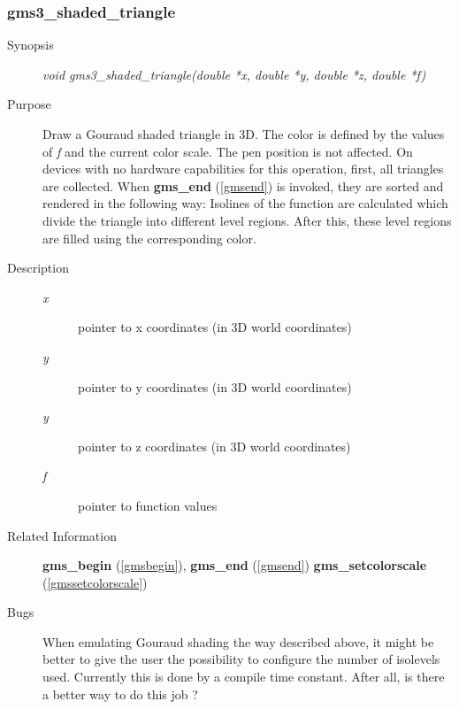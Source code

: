\subsubsection{gms3\_shaded\_triangle\label{gms3shadedtriangle}}
\begin{description}
\item[Synopsis]\mbox{}


{\em void    gms3\_shaded\_triangle(double *x, double *y, double *z, double *f)\/}
\item[Purpose]\mbox{}


Draw a Gouraud shaded triangle in 3D. The color is defined by
the values of {\em f\/} and the current color scale.
The pen position is not affected.
On devices with no hardware capabilities for this operation,
first, all triangles are collected.
When 
{\bf gms\_end} (\ref{gmsend})
is invoked, they are sorted and rendered 
in the following way:
Isolines of the function are calculated which divide the 
triangle into different level regions. After this, these 
level regions are filled using the corresponding color.

\item[Description]\mbox{}


\begin{description}
\item[{\em x\/}]\mbox{}

 pointer to x coordinates (in 3D world coordinates)
\item[{\em y\/}]\mbox{}

 pointer to y coordinates (in 3D world coordinates)
\item[{\em y\/}]\mbox{}

 pointer to z coordinates (in 3D world coordinates)
\item[{\em f\/}]\mbox{}

 pointer to function values
\end{description}

\item[Related Information]\mbox{}


{\bf gms\_begin} (\ref{gmsbegin}), 
{\bf gms\_end} (\ref{gmsend})
{\bf gms\_setcolorscale} (\ref{gmssetcolorscale}) 
\item[Bugs]\mbox{}


When emulating Gouraud shading the way described above,
it might be better to give the user the possibility 
to configure the number of isolevels used. Currently this
is done by a compile time constant.
After all, is there a better way to do   this job ?

\end{description}



